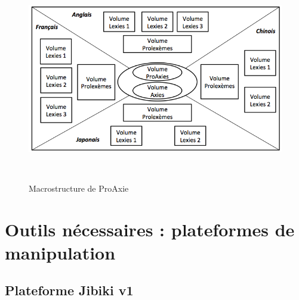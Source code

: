 \documentclass[10pt,a4paper,twoside]{article}
\begin{document}
\begin{figure}[htbp] 
\begin{center} 
\includegraphics[width=12cm]{images/proaxie.png}
\end{center} 
\caption{Macrostructure de ProAxie} \label{image-macrostructure-proaxie} \
\end{figure}

\section{Outils nécessaires : plateformes de manipulation}

\subsection{Plateforme Jibiki v1}
\end{document}
